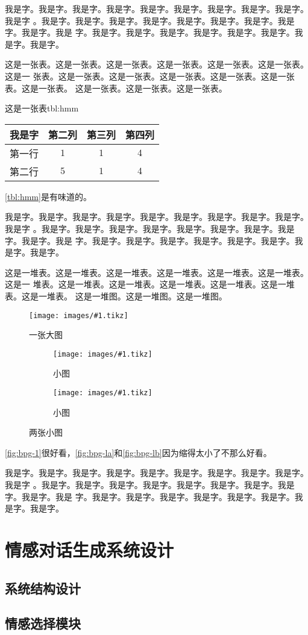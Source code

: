\documentclass[supercite]{HustGraduPaper}
\newcommand{\cfig}[3]{
  \begin{figure}[htb]
    \centering
    \texttt{[image: images/\#1.tikz]}
    \caption{#3}
    \label{fig:#1}
  \end{figure}
}
\newcommand{\sfig}[3]{
  \begin{subfigure}[b]{#2\textwidth}
    \texttt{[image: images/\#1.tikz]}
    \caption{#3}
    \label{fig:#1}
  \end{subfigure}
}
\newcommand{\xfig}[3]{
  \begin{figure}[htb]
    \centering
    #3
    \caption{#2}
    \label{fig:#1}
  \end{figure}
}
\newcommand{\rfig}[1]{\autoref{fig:#1}}
\newcommand{\rtbl}[1]{\autoref{tbl:#1}}
\theoremstyle{definition}
\begin{document}
我是字。我是字。我是字。我是字。我是字。我是字。我是字。我是字。我是字。我是字
。我是字。我是字。我是字。我是字。我是字。我是字。我是字。我是字。我是字。我是
字。我是字。我是字。我是字。我是字。我是字。我是字。我是字。我是字。


这是一张表。这是一张表。这是一张表。这是一张表。这是一张表。这是一张表。这是一
张表。这是一张表。这是一张表。这是一张表。这是一张表。这是一张表。这是一张表。
这是一张表。这是一张表。这是一张表。

\begin{generaltab}{这是一张表}{tbl:hmm}
  \begin{tabular}{c|ccc}
    \toprule
    我是字 & 第二列 & 第三列 & 第四列 \\
    \midrule
    第一行 & $1$ & $1$ & $4$ \\
    第二行 & $5$ & $1$ & $4$ \\
    \bottomrule
  \end{tabular}
\end{generaltab}

\rtbl{hmm}是有味道的。

我是字。我是字。我是字。我是字。我是字。我是字。我是字。我是字。我是字。我是字
。我是字。我是字。我是字。我是字。我是字。我是字。我是字。我是字。我是字。我是
字。我是字。我是字。我是字。我是字。我是字。我是字。我是字。我是字。


这是一堆表。这是一堆表。这是一堆表。这是一堆表。这是一堆表。这是一堆表。这是一
堆表。这是一堆表。这是一堆表。这是一堆表。这是一堆表。这是一堆表。这是一堆表。
这是一堆图。这是一堆图。这是一堆图。

\cfig{bpg-1}{0.8}{一张大图}

\xfig{bpg-l}{两张小图}{
  \sfig{bpg-la}{0.3}{小图}
  \sfig{bpg-lb}{0.3}{小图}
}

\rfig{bpg-1}很好看，\rfig{bpg-la}和\rfig{bpg-lb}因为缩得太小了不那么好看。

我是字。我是字。我是字。我是字。我是字。我是字。我是字。我是字。我是字。我是字
。我是字。我是字。我是字。我是字。我是字。我是字。我是字。我是字。我是字。我是
字。我是字。我是字。我是字。我是字。我是字。我是字。我是字。我是字。

\section{情感对话生成系统设计}
\subsection{系统结构设计}
\subsection{情感选择模块}
\end{document}

